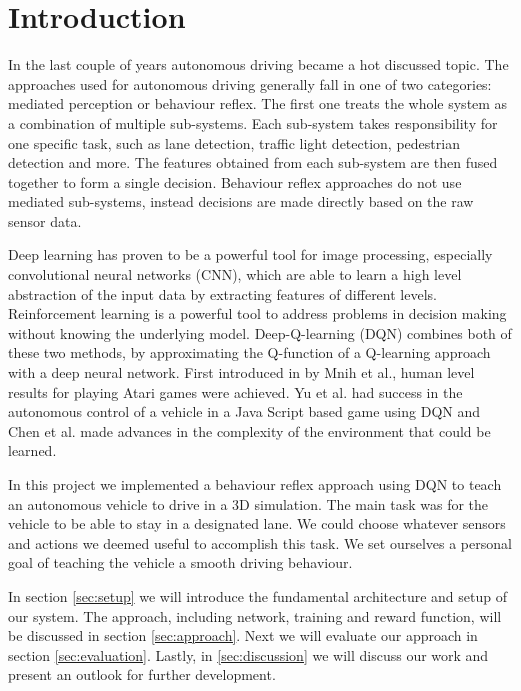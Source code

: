 
\section{Introduction}

In the last couple of years autonomous driving became a hot discussed topic. The approaches used for autonomous driving generally fall in one of two categories: mediated perception or behaviour reflex. The first one treats the whole system as a combination of multiple sub-systems. Each sub-system takes responsibility for one specific task, such as lane detection, traffic light detection, pedestrian detection and more. The features obtained from each sub-system are then fused together to form a single decision. Behaviour reflex approaches do not use mediated sub-systems, instead decisions are made directly based on the raw sensor data.

Deep learning has proven to be a powerful tool for image processing, especially convolutional neural networks (CNN), which are able to learn a high level abstraction of the input data by extracting features of different levels. Reinforcement learning is a powerful tool to address problems in decision making without knowing the underlying model. Deep-Q-learning (DQN) combines both of these two methods, by approximating the Q-function of a Q-learning approach with a deep neural network. First introduced in \cite{Mnih13} by Mnih et al., human level results for playing Atari games were achieved. Yu et al. \cite{yudeep} had success in the autonomous control of a vehicle in a Java Script based game using DQN and Chen et al. \cite{chen2015deepdriving} made advances in the complexity of the environment that could be learned. 

In this project we implemented a behaviour reflex approach using DQN to teach an autonomous vehicle to drive in a 3D simulation. The main task was for the vehicle to be able to stay in a designated lane. We could choose whatever sensors and actions we deemed useful to accomplish this task. We set ourselves a personal goal of teaching the vehicle a smooth driving behaviour.

In section \ref{sec:setup} we will introduce the fundamental architecture and setup of our system. The approach, including network, training and reward function, will be discussed in section \ref{sec:approach}. Next we will evaluate our approach in section  \ref{sec:evaluation}. Lastly, in \ref{sec:discussion} we will discuss our work and present an outlook for further development.